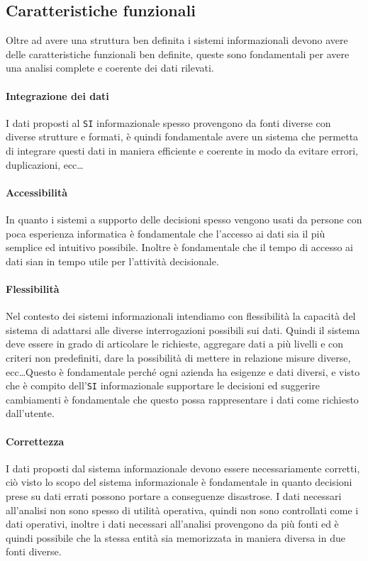     \subsection{Caratteristiche funzionali}
        Oltre ad avere una struttura ben definita i sistemi informazionali devono avere delle caratteristiche funzionali ben definite, queste sono fondamentali per avere una analisi complete e coerente dei dati rilevati.
        \paragraph{Integrazione dei dati} I dati proposti al \texttt{SI} informazionale spesso provengono da fonti diverse con diverse strutture e formati, è quindi fondamentale avere un sistema che permetta di integrare questi dati in maniera efficiente e coerente in modo da evitare errori, duplicazioni, ecc\dots
        \paragraph{Accessibilità} In quanto i sistemi a supporto delle decisioni spesso vengono usati da persone con poca esperienza informatica è fondamentale che l'accesso ai dati sia il più semplice ed intuitivo possibile. Inoltre è fondamentale che il tempo di accesso ai dati sian in tempo utile per l'attività decisionale.
        \paragraph{Flessibilità} Nel contesto dei sistemi informazionali intendiamo con flessibilità la capacità del sistema di adattarsi alle diverse interrogazioni possibili sui dati. Quindi il sistema deve essere in grado di articolare le richieste, aggregare dati a più livelli e con criteri non predefiniti, dare la possibilità di mettere in relazione misure diverse, ecc\dots Questo è fondamentale perché ogni azienda ha esigenze e dati diversi, e visto che è compito dell'\texttt{SI} informazionale supportare le decisioni ed suggerire cambiamenti è fondamentale che questo possa rappresentare i dati come richiesto dall'utente.
        \paragraph{Correttezza} I dati proposti dal sistema informazionale devono essere necessariamente corretti, ciò visto lo scopo del sistema informazionale è fondamentale in quanto decisioni prese su dati errati possono portare a conseguenze disastrose. I dati necessari all'analisi non sono spesso di utilità operativa, quindi non sono controllati come i dati operativi, inoltre i dati necessari all'analisi provengono da più fonti ed è quindi possibile che la stessa entità sia memorizzata in maniera diversa in due fonti diverse.
